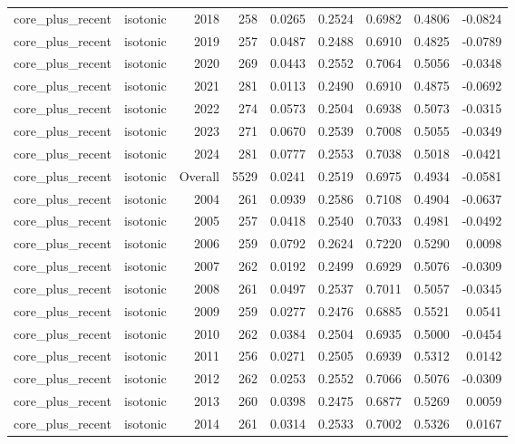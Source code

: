 \begin{table}[t]
\begin{tabular}{@{} l l r r r r r r r @{} }
      core\_plus\_recent & isotonic & 2018 & 258 & 0.0265 & 0.2524 & 0.6982 & 0.4806 & -0.0824 \\
      core\_plus\_recent & isotonic & 2019 & 257 & 0.0487 & 0.2488 & 0.6910 & 0.4825 & -0.0789 \\
      core\_plus\_recent & isotonic & 2020 & 269 & 0.0443 & 0.2552 & 0.7064 & 0.5056 & -0.0348 \\
      core\_plus\_recent & isotonic & 2021 & 281 & 0.0113 & 0.2490 & 0.6910 & 0.4875 & -0.0692 \\
      core\_plus\_recent & isotonic & 2022 & 274 & 0.0573 & 0.2504 & 0.6938 & 0.5073 & -0.0315 \\
      core\_plus\_recent & isotonic & 2023 & 271 & 0.0670 & 0.2539 & 0.7008 & 0.5055 & -0.0349 \\
      core\_plus\_recent & isotonic & 2024 & 281 & 0.0777 & 0.2553 & 0.7038 & 0.5018 & -0.0421 \\
      core\_plus\_recent & isotonic & Overall & 5529 & 0.0241 & 0.2519 & 0.6975 & 0.4934 & -0.0581 \\
      core\_plus\_recent & isotonic & 2004 & 261 & 0.0939 & 0.2586 & 0.7108 & 0.4904 & -0.0637 \\
      core\_plus\_recent & isotonic & 2005 & 257 & 0.0418 & 0.2540 & 0.7033 & 0.4981 & -0.0492 \\
      core\_plus\_recent & isotonic & 2006 & 259 & 0.0792 & 0.2624 & 0.7220 & 0.5290 & 0.0098 \\
      core\_plus\_recent & isotonic & 2007 & 262 & 0.0192 & 0.2499 & 0.6929 & 0.5076 & -0.0309 \\
      core\_plus\_recent & isotonic & 2008 & 261 & 0.0497 & 0.2537 & 0.7011 & 0.5057 & -0.0345 \\
      core\_plus\_recent & isotonic & 2009 & 259 & 0.0277 & 0.2476 & 0.6885 & 0.5521 & 0.0541 \\
      core\_plus\_recent & isotonic & 2010 & 262 & 0.0384 & 0.2504 & 0.6935 & 0.5000 & -0.0454 \\
      core\_plus\_recent & isotonic & 2011 & 256 & 0.0271 & 0.2505 & 0.6939 & 0.5312 & 0.0142 \\
      core\_plus\_recent & isotonic & 2012 & 262 & 0.0253 & 0.2552 & 0.7066 & 0.5076 & -0.0309 \\
      core\_plus\_recent & isotonic & 2013 & 260 & 0.0398 & 0.2475 & 0.6877 & 0.5269 & 0.0059 \\
      core\_plus\_recent & isotonic & 2014 & 261 & 0.0314 & 0.2533 & 0.7002 & 0.5326 & 0.0167 \\

\end{tabular}
\end{table}
